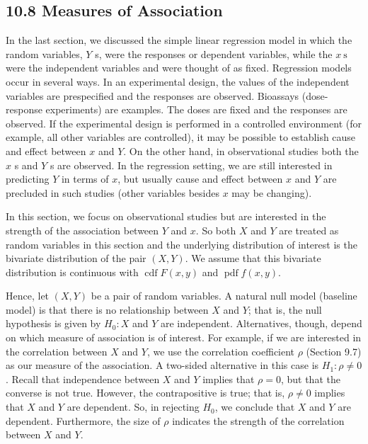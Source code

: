 \subsection*{10.8 Measures of Association}
In the last section, we discussed the simple linear regression model in which the random variables, $Y$ s, were the responses or dependent variables, while the $x \mathrm{~s}$ were the independent variables and were thought of as fixed. Regression models occur in several ways. In an experimental design, the values of the independent variables are prespecified and the responses are observed. Bioassays (dose-response experiments) are examples. The doses are fixed and the responses are observed. If the experimental design is performed in a controlled environment (for example, all other variables are controlled), it may be possible to establish cause and effect between $x$ and $Y$. On the other hand, in observational studies both the $x$ s and $Y$ s are observed. In the regression setting, we are still interested in predicting $Y$ in terms of $x$, but usually cause and effect between $x$ and $Y$ are precluded in such studies (other variables besides $x$ may be changing).

In this section, we focus on observational studies but are interested in the strength of the association between $Y$ and $x$. So both $X$ and $Y$ are treated as random variables in this section and the underlying distribution of interest is the bivariate distribution of the pair $(X, Y)$. We assume that this bivariate distribution is continuous with $\operatorname{cdf} F(x, y)$ and $\operatorname{pdf} f(x, y)$.

Hence, let $(X, Y)$ be a pair of random variables. A natural null model (baseline model) is that there is no relationship between $X$ and $Y$; that is, the null hypothesis is given by $H_{0}: X$ and $Y$ are independent. Alternatives, though, depend on which measure of association is of interest. For example, if we are interested in the correlation between $X$ and $Y$, we use the correlation coefficient $\rho$ (Section 9.7) as our measure of the association. A two-sided alternative in this case is $H_{1}: \rho \neq 0$. Recall that independence between $X$ and $Y$ implies that $\rho=0$, but that the converse is not true. However, the contrapositive is true; that is, $\rho \neq 0$ implies that $X$ and $Y$ are dependent. So, in rejecting $H_{0}$, we conclude that $X$ and $Y$ are dependent. Furthermore, the size of $\rho$ indicates the strength of the correlation between $X$ and $Y$.

